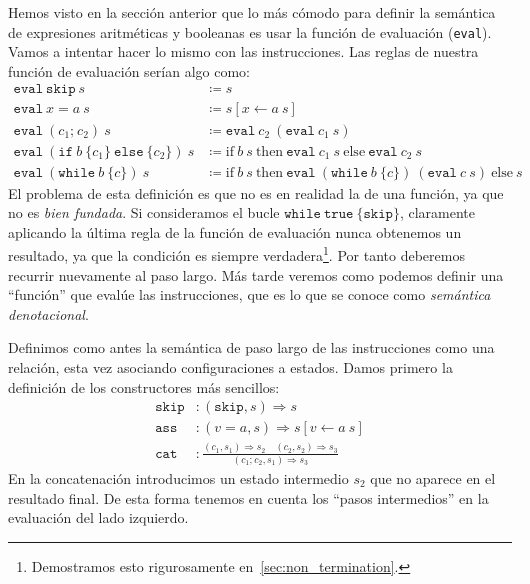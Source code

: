 \documentclass[
  a4paper, 
  10pt, 
  parskip=half, 
  toc=bibliography,
]{scrbook}
\theoremstyle{definition}
\theoremstyle{bolddef}
\newcommand{\funfont}[1]{\texttt{#1}}
\newcommand{\ImpIfElse}[3]{\texttt{if} \ {#1} \ \{{#2}\} \ \texttt{else} \ \{{#3}\}}
\newcommand{\ImpWhile}[2]{\texttt{while} \ {#1} \ \{{#2}\}}
\newcommand{\ImpConcat}[2]{{#1} \texttt{;} \ {#2}}
\newcommand{\ImpSkip}{\texttt{skip}}
\newcommand{\ImpAssign}[2]{{#1} = {#2}}
\newcommand{\LeanIfElse}[3]{\text{if} \ {#1} \ \text{then} \ {#2} \ \text{else} \ {#3}}
\newcommand{\ImpTrue}{\texttt{true}}
\newcommand{\bigstep}{\Longrightarrow}
\begin{document}
Hemos visto en la sección anterior que lo más cómodo para definir la semántica de
expresiones aritméticas y booleanas es usar la función de evaluación
(\funfont{eval}). Vamos a intentar hacer lo mismo con las instrucciones. Las reglas
de nuestra función de evaluación serían algo como:
\begin{align*}
  \funfont{eval} \ \ImpSkip \ s &\coloneqq s \\
  \funfont{eval} \ \ImpAssign{x}{a} \ s &\coloneqq s[x \leftarrow a \ s] \\
  \funfont{eval} \ (\ImpConcat{c_1}{c_2}) \ s &\coloneqq \funfont{eval} \ c_2 \ (\funfont{eval} \ c_1 \ s) \\
  \funfont{eval} \ (\ImpIfElse{b}{c_1}{c_2}) \ s &\coloneqq
    \LeanIfElse{b \ s}{\funfont{eval} \ c_1 \ s}{\funfont{eval} \ c_2 \ s} \\
  \funfont{eval} \ (\ImpWhile{b}{c}) \ s &\coloneqq
    \LeanIfElse{b \ s}{\funfont{eval} \ (\ImpWhile{b}{c}) \ (\funfont{eval} \ c \ s)}{s}
\end{align*}
El problema de esta definición es que no es en realidad la de una función, ya 
que no es \emph{bien fundada}. Si consideramos el bucle \(\ImpWhile{\ImpTrue}{\ImpSkip}\),
claramente aplicando la última regla de la función de evaluación nunca
obtenemos un resultado, ya que la condición es siempre verdadera\footnote{
  Demostramos esto rigurosamente en~\ref{sec:non_termination}.}.
Por tanto deberemos recurrir nuevamente al paso largo. Más tarde veremos como
podemos definir una \enquote{función} que evalúe las instrucciones, que es lo que se
conoce como \emph{semántica denotacional}.

Definimos como antes la semántica de paso largo de las instrucciones como una relación,
esta vez asociando configuraciones a estados. Damos primero la definición de los 
constructores más sencillos:
\begin{align*}
  \ImpSkip &: (\ImpSkip, s) \bigstep s \\
  \funfont{ass} &: (v = a, s) \bigstep s[v \leftarrow a \ s] \\
  \funfont{cat} &: \frac{
    (c_1, s_1) \bigstep s_2 \quad (c_2, s_2) \bigstep s_3
  }{
    (\ImpConcat{c_1}{c_2}, s_1) \bigstep s_3
  }
\end{align*}
En la concatenación introducimos un estado intermedio \(s_2\) que no 
aparece en el resultado final. De esta forma tenemos en cuenta los 
\enquote{pasos intermedios} en la evaluación del lado izquierdo.
\end{document}
